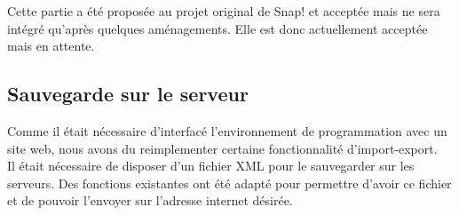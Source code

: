 Cette partie a été proposée au projet original de Snap! et acceptée mais ne sera intégré qu'après quelques aménagements. Elle est donc actuellement acceptée mais en attente.

\subsection{Sauvegarde sur le serveur}
Comme il était nécessaire d'interfacé l'environnement de programmation avec un site web, nous avons du reimplementer certaine fonctionnalité d'import-export.\\

Il était nécessaire de disposer d'un fichier XML pour le sauvegarder sur les serveurs. Des fonctions existantes ont été adapté pour permettre d'avoir ce fichier et de pouvoir l'envoyer sur l'adresse internet désirée.

